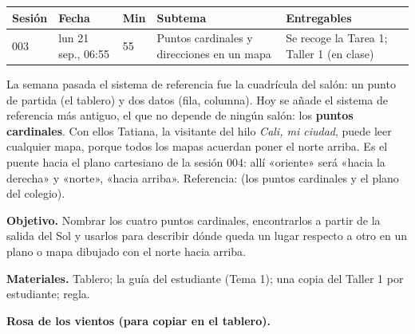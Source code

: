 \documentclass[11pt]{article}
\begin{document}
\encabezado*

\begin{center}
{\renewcommand{\arraystretch}{1.3}
\begin{tabularx}{\linewidth}{@{}l l l X l@{}}
  \toprule
  \textbf{Sesión} & \textbf{Fecha} & \textbf{Min} & \textbf{Subtema} & \textbf{Entregables}\\
  \midrule
  003 & lun 21 sep., 06:55 & 55 & Puntos cardinales y direcciones en un mapa
      & Se recoge la Tarea 1; Taller 1 (en clase)\\
  \bottomrule
\end{tabularx}}
\end{center}

La semana pasada el sistema de referencia fue la cuadrícula del salón: un punto de partida (el
tablero) y dos datos (fila, columna). Hoy se añade el sistema de referencia más antiguo, el que
no depende de ningún salón: los \textbf{puntos cardinales}. Con ellos Tatiana, la visitante del
hilo \emph{Cali, mi ciudad}, puede leer cualquier mapa, porque todos los mapas acuerdan poner
el norte arriba. Es el puente hacia el plano cartesiano de la sesión 004: allí «oriente» será
«hacia la derecha» y «norte», «hacia arriba».
Referencia:  (los puntos cardinales y el plano del colegio).


\textbf{Objetivo.} Nombrar los cuatro puntos cardinales, encontrarlos a partir de la salida
del Sol y usarlos para describir dónde queda un lugar respecto a otro en un plano o mapa
dibujado con el norte hacia arriba.

\textbf{Materiales.} Tablero; la guía del estudiante (Tema 1); una copia del Taller 1 por
estudiante; regla.

\textbf{Rosa de los vientos (para copiar en el tablero).}

\begin{center}
\end{center}
\end{document}
